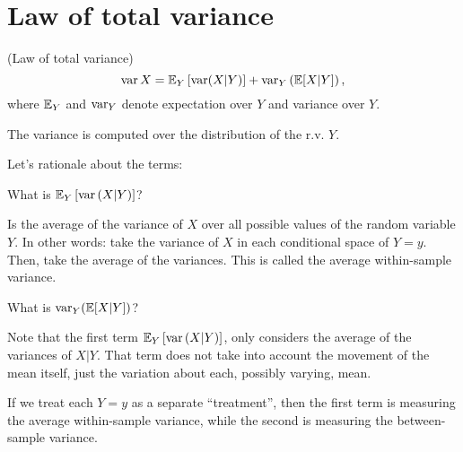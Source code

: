 \section{Law of total variance}

\begin{theorema}{(Law of total variance)}{}
    \useshortskip
    \[
        \operatorname{var}  X = \mathbb{E}_Y\left[\operatorname{var} (X | Y)\right] + \operatorname{var}_Y \left(\mathbb{E}[X|Y]\right),
    \]
    where $\mathbb{E}_Y$ and $\operatorname{var}_Y$ denote expectation over $Y$ and variance over $Y$.
\end{theorema}
\par The variance is computed over the distribution of the r.v. $Y$.
\par
Let's rationale about the terms:
\begin{thesis}{}{}
    What is $\mathbb{E}_Y \left[\operatorname{var} \left(X | Y\right)\right]$?
\end{thesis}
\par 
Is the average of the variance of $X$ over all possible values of the random variable $Y$. In other words: take the variance of $X$ in each conditional space of $Y = y$. Then, take the average of the variances. This is called the average within-sample variance.

\begin{thesis}{}{}
    What is $\operatorname{var}_Y (\mathbb{E}[X|Y])$?
\end{thesis}
\par 
Note that the first term $\mathbb{E}_Y \left[\operatorname{var} \left(X | Y\right)\right]$, only considers the average of the variances of $X | Y$. That term does not take into account the movement of the mean itself, just the variation about each, possibly varying, mean.

\par
If we treat each $Y = y$ as a separate ``treatment'', then the first term is measuring the average within-sample variance, while the second is measuring the between-sample variance.